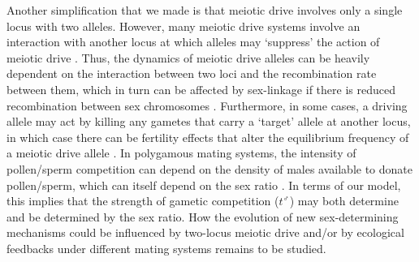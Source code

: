 \documentclass[12pt]{article}
\begin{document}
Another simplification that we made is that meiotic drive involves only a single locus with two alleles. 
However, many meiotic drive systems involve an interaction with another locus at which alleles may `suppress' the action of meiotic drive \citep[][]{Burt:2006,Lindholm:2016cw}.
Thus, the dynamics of meiotic drive alleles can be heavily dependent on the interaction between two loci and the recombination rate between them, which in turn can be affected by sex-linkage if there is reduced recombination between sex chromosomes \citep{Hurst:1991uh}.
Furthermore, in some cases, a driving allele may act by killing any gametes that carry a `target' allele at another locus, in which case there can be fertility effects that alter the equilibrium frequency of a meiotic drive allele \citep{Holman:2015en}. 
In polygamous mating systems, the intensity of pollen/sperm competition can depend on the density of males available to donate pollen/sperm, which can itself depend on the sex ratio \citep{Taylor:2002wu}. 
In terms of our model, this implies that the strength of gametic competition ($t^\male$) may both determine and be determined by the sex ratio. 
How the evolution of new sex-determining mechanisms could be influenced by two-locus meiotic drive and/or by ecological feedbacks under different mating systems remains to be studied.
\end{document}
